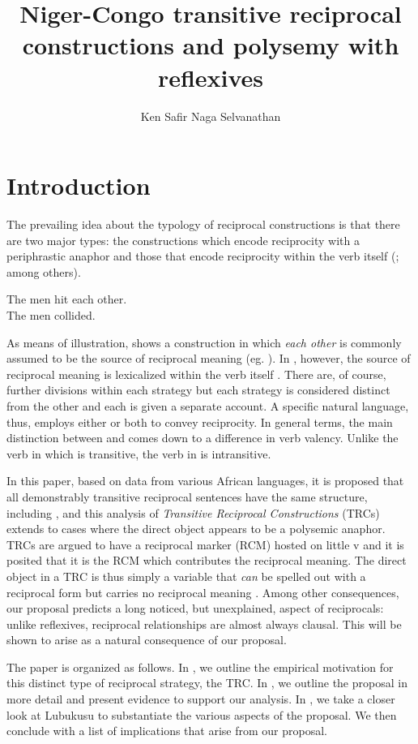 \documentclass[output=paper]{langsci/langscibook}
\title{Niger-Congo transitive reciprocal constructions and polysemy with reflexives}
\author{%
 Ken Safir\lastand 
 Naga Selvanathan \affiliation{Rutgers University} 
}
\begin{document}
 

\section{Introduction}

 The prevailing idea about the typology of reciprocal constructions is that there are two major types: the constructions which encode reciprocity with a periphrastic anaphor and those that encode reciprocity within the verb itself (\citealt{KonigGast2008}; \citealt{Siloni2012} among others).


\ea
\ea
The men hit each other.  \\
\ex
The men collided.\\
\z
\z

As means of illustration,  shows a construction in which \textit{each other} is commonly assumed to be the source of reciprocal meaning (eg. \citealt{HeimEtAl1991}). In , however, the source of reciprocal meaning is lexicalized within the verb itself \citep{Siloni2012}.  There are, of course, further divisions within each strategy but each strategy is considered distinct from the other and each is given a separate account. A specific natural language, thus, employs either or both to convey reciprocity. In general terms, the main distinction between  and  comes down to a difference in verb valency. Unlike the verb in  which is transitive, the verb in  is intransitive.
 
  In this paper, based on data from various African languages, it is proposed that all demonstrably transitive reciprocal sentences have the same structure, including , and this analysis of \textit{Transitive Reciprocal Constructions} (TRCs) extends to cases where the direct object appears to be a polysemic anaphor. TRCs are argued to have a reciprocal marker (RCM) hosted on little v and it is posited that it is the RCM which contributes the reciprocal meaning. The direct object in a TRC is thus simply a variable that \textit{can} be spelled out with a reciprocal form but carries no reciprocal meaning \citep{Safir2014}. Among other consequences, our proposal predicts a long noticed, but unexplained, aspect of reciprocals: unlike reflexives, reciprocal relationships are almost always clausal. This will be shown to arise as a natural consequence of our proposal.
 
  The paper is organized as follows. In , we outline the empirical motivation for this distinct type of reciprocal strategy, the TRC. In , we outline the proposal in more detail and present evidence to support our analysis. In , we take a closer look at Lubukusu to substantiate the various aspects of the proposal. We then conclude with a list of implications that arise from our proposal.
 
\end{document}
